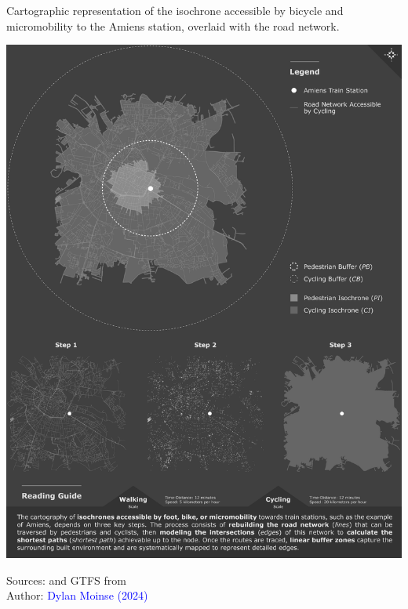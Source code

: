 \begin{refsegment}
\begin{carte}[h!]\vspace*{4pt}
    \caption{Cartographic representation of the isochrone accessible by bicycle and micromobility to the Amiens station, overlaid with the road network.}
    \label{fig-chap3:isochrone-amiens-finale}
    \centerline{\includegraphics[width=1\columnwidth]{src/Figures/Chap-3/EN_Carte_Isochrones_Buffers_Amiens.png}}
    \vspace{5pt}
    \begin{flushright}\scriptsize{
    Sources: \textcolor{blue}{\textcite{openstreetmap_openstreetmap_2023}} and \acrshort{GTFS} from \textcolor{blue}{\textcite{sncf_reseau_2024}}
    \\
    Author: \textcolor{blue}{Dylan Moinse (2024)}
    }\end{flushright}
\end{carte}


\end{refsegment}
